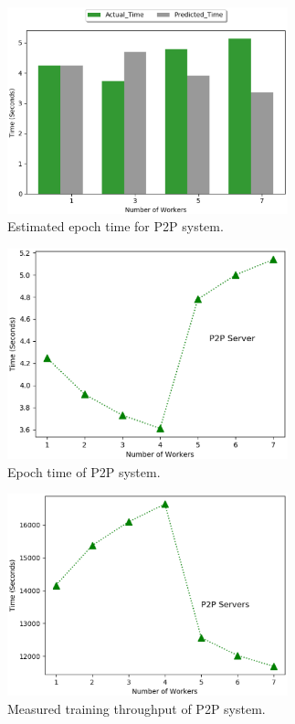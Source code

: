 \documentclass[conference]{IEEEtran}
\begin{document}
\begin{figure}[htb]
  \includegraphics[width=3.2in]{Fig/p2pmodel}
  \caption{Estimated epoch time for P2P system.}
  \label{fig:p2pmodel}
\end{figure}

\begin{figure}[htb]
  \includegraphics[width=3.2in]{Fig/p2platency}
  \caption{Epoch time of P2P system.}
  \label{fig:p2platency}
\end{figure}

\begin{figure}[htb]
  \includegraphics[width=3.2in]{Fig/p2pthroughput}
  \caption{Measured training throughput of P2P system.}
  \label{fig:p2pthroughput}
\end{figure}
\end{document}
